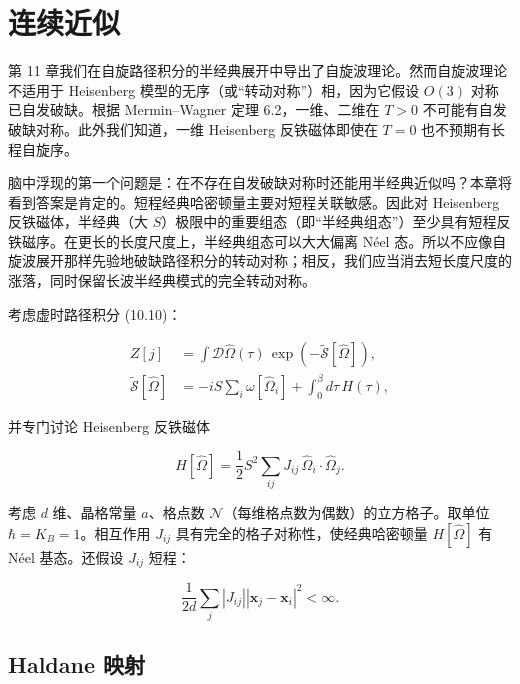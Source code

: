 \chapter{连续近似}

第 11 章我们在自旋路径积分的半经典展开中导出了自旋波理论。然而自旋波理论不适用于 Heisenberg 模型的无序（或“转动对称”）相，因为它假设 $O(3)$ 对称已自发破缺。根据 Mermin--Wagner 定理 6.2，一维、二维在 $T > 0$ 不可能有自发破缺对称。此外我们知道，一维 Heisenberg 反铁磁体即使在 $T = 0$ 也不预期有长程自旋序。

脑中浮现的第一个问题是：在不存在自发破缺对称时还能用半经典近似吗？本章将看到答案是肯定的。短程经典哈密顿量主要对短程关联敏感。因此对 Heisenberg 反铁磁体，半经典（大 $S$）极限中的重要组态（即“半经典组态”）至少具有短程反铁磁序。在更长的长度尺度上，半经典组态可以大大偏离 Néel 态。所以不应像自旋波展开那样先验地破缺路径积分的转动对称；相反，我们应当消去短长度尺度的涨落，同时保留长波半经典模式的完全转动对称。

考虑虚时路径积分 (10.10)：

\begin{align*}
Z [ j ] & = \int \mathcal {D} \hat {\Omega} ( \tau ) \, \exp \left( - \tilde {\mathcal {S}} [ \hat {\Omega} ] \right) ,\\
\tilde {\mathcal {S}} [ \hat {\Omega} ] & = - i S \sum_ {i} \omega [ \hat {\Omega} _ {i} ] + \int_ {0} ^ {\beta} d \tau \, H ( \tau ) ,
\tag{12.1}
\end{align*}

并专门讨论 Heisenberg 反铁磁体

\begin{equation*}
H [ \hat {\Omega} ] = \frac {1}{2} S ^ {2} \sum_ {ij} J _ {ij} \, \hat {\Omega} _ {i} \cdot \hat {\Omega} _ {j}.
\tag{12.2}
\end{equation*}

考虑 $d$ 维、晶格常量 $a$、格点数 $\mathcal{N}$（每维格点数为偶数）的立方格子。取单位 $\hbar = K_{B} = 1$。相互作用 $J_{ij}$ 具有完全的格子对称性，使经典哈密顿量 $H[\hat{\Omega}]$ 有 Néel 基态。还假设 $J_{ij}$ 短程：

\begin{equation*}
\frac {1}{2 d} \sum_ {j} \left| J _ {ij} \right| \left| \mathbf {x} _ {j} - \mathbf {x} _ {i} \right| ^ {2} < \infty .
\tag{12.3}
\end{equation*}

\section{Haldane 映射}

